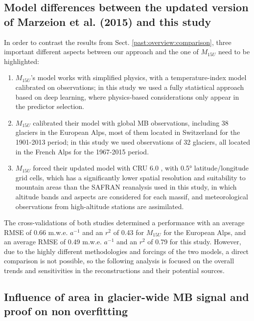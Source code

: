 {\subsection{Model differences between the updated version of Marzeion et al. (2015) and this study} \label{past:supp:diff}

In order to contrast the results from Sect. \ref{past:overview:comparison}, three important different aspects between our approach and the one of $M_{15U}$ need to be highlighted: 

\begin{enumerate}
\item $M_{15U}$’s model works with simplified physics, with a temperature-index model calibrated on observations; in this study we used a fully statistical approach based on deep learning, where physics-based considerations only appear in the predictor selection.
\item $M_{15U}$ calibrated their model with global MB observations, including 38 glaciers in the European Alps, most of them located in Switzerland for the 1901-2013 period; in this study we used observations of 32 glaciers, all located in the French Alps for the 1967-2015 period.
\item $M_{15U}$ forced their updated model with CRU 6.0 \citep[update of][]{harris_updated_2014}, with 0.5° latitude/longitude grid cells, which has a significantly lower spatial resolution and suitability to mountain areas than the SAFRAN reanalysis \citep{durand_reanalysis_2009} used in this study, in which altitude bands and aspects are considered for each massif, and meteorological observations from high-altitude stations are assimilated.
\end{enumerate}

The cross-validations of both studies determined a performance with an average RMSE of 0.66 m.w.e. $a^{-1}$ and an $r^{2}$ of 0.43 for $M_{15U}$ for the European Alps, and an average RMSE of 0.49 m.w.e. $a^{-1}$ and an $r^{2}$ of 0.79 for this study. However, due to the highly different methodologies and forcings of the two models, a direct comparison is not possible, so the following analysis is focused on the overall trends and sensitivities in the reconstructions and their potential sources. 

\subsection{Influence of area in glacier-wide MB signal and proof on non overfitting} \label{past:supp:overfitting}

}
